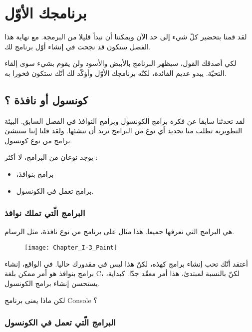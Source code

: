 \chapter{برنامجك الأوّل}

لقد قمنا بتحضير كلّ شيء إلى حد الآن ويمكننا أن نبدأ قليلا من البرمجة. مع نهاية هذا الفصل ستكون قد نجحت في إنشاء أوّل برنامج لك.

لكي أصدقك القول، سيظهر البرنامج بالأبيض والأسود ولن يقوم بشيء سوى إلقاء التحيّة. يبدو عديم الفائدة، لكنّه برنامجك الأوّل وأؤكّد لك أنّك ستكون فخورا به.

\section{كونسول أو نافذة ؟}

لقد تحدثنا سابقا عن فكرة برامج الكونسول وبرامج النوافذ في الفصل السابق. البيئة التطويرية تطلب منا تحديد أي نوع من البرامج نريد أن ننشئها. ولقد قلنا إننا سننشئ برامج من نوع كونسول.

يوجد نوعان من البرامج، لا أكثر :

\begin{itemize}
  \item ،برامج بنوافذ
  \item برامج تعمل في الكونسول.
\end{itemize}

\subsection{البرامج الّتي تملك نوافذ}

هي البرامج التي نعرفها جميعا. هذا مثال على برنامج من نوع نافذة، مثل الرسام.

\begin{figure}[H]
	\centering
	\texttt{[image: Chapter\_I-3\_Paint]}
\end{figure}

أعتقد أنّك تحب إنشاء برامج كهذه، لكنّ هذا ليس في مقدورك حاليا. في الواقع، إنشاء برامج بنوافذ هو أمر ممكن بلغة \textenglish{C}، لكنّ بالنسبة لمبتدئ، هذا أمر معقّد جدّا. كبداية، يستحسن إنشاء برامج الكونسول.

\begin{question}
  لكن ماذا يعنى برنامج
\textenglish{Console}
؟
\end{question}

\subsection{البرامج الّتي تعمل في الكونسول}

